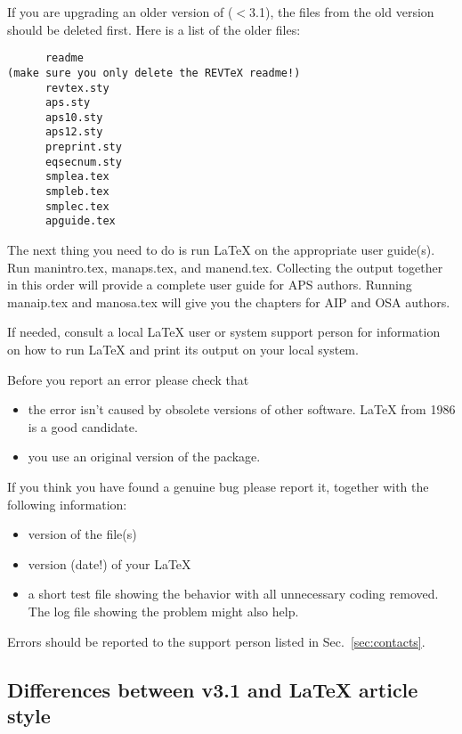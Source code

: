 If you are upgrading an older version of \REVTeX{} ($<$3.1), the files from
the old version should be deleted first. Here is a list of the older files:

\begin{verbatim}
      readme
(make sure you only delete the REVTeX readme!)
      revtex.sty
      aps.sty
      aps10.sty
      aps12.sty
      preprint.sty
      eqsecnum.sty
      smplea.tex
      smpleb.tex
      smplec.tex
      apguide.tex
\end{verbatim}

The next thing you need to do is run \LaTeX{} on the appropriate user
guide(s). Run manintro.tex, manaps.tex, and manend.tex. Collecting the
output together in this order will provide a complete user guide for APS
authors. Running manaip.tex and manosa.tex will give you the chapters for
AIP and OSA authors.

If needed, consult a local \LaTeX{} user or system support person for
information on how to run \LaTeX{} and print its output on your local
system.



Before you report an error please check that
\begin{itemize}
  \item the error isn't caused by obsolete versions of other software.
    \LaTeX{} from 1986 is a good candidate.

  \item you use an original version of the package.
\end{itemize}


If you think you have found a genuine bug please report it, together
with the following information:
\begin{itemize}
  \item version of the \REVTeX{} file(s)

  \item version (date!) of your \LaTeX{}

  \item a short test file showing the behavior with all unnecessary
    coding removed. The log file showing the problem might also help.
\end{itemize}

Errors should be reported to the support person listed in
Sec.\ \ref{sec:contacts}.


\subsection[Differences between \REVTeX{} v3.1 and \LaTeX{} article style]%
{Differences between \REVTeX{} v3.1 and LaTeX{} article style}
\label{sec:ltor}

